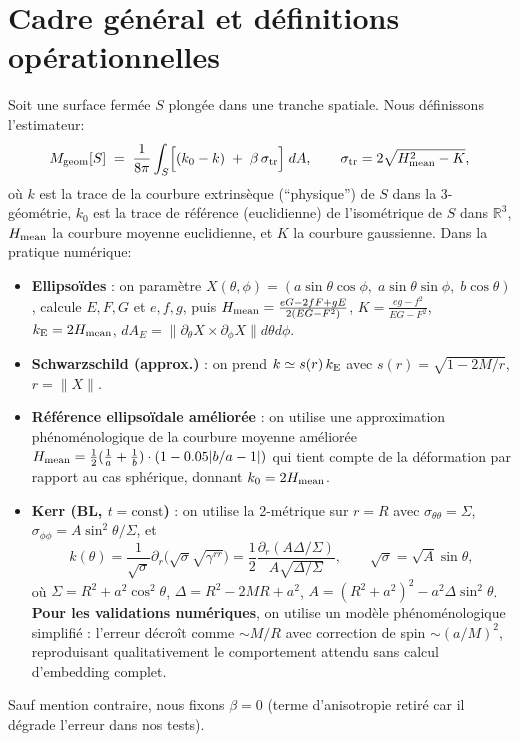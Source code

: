 \documentclass[11pt]{article}
\begin{document}
\section{Cadre g\'en\'eral et d\'efinitions op\'erationnelles}
Soit une surface ferm\'ee $S$ plong\'ee dans une tranche spatiale. Nous d\'efinissons l'estimateur:
\begin{equation}
M_{\rm geom}[S] \;=\; \frac{1}{8\pi}\int_S\!\Big[(k_0 - k)\;+\;\beta\,\sigma_{\rm tr}\Big]\; dA,
\qquad \sigma_{\rm tr}=2\sqrt{H_{\rm mean}^2-K},
\end{equation}
o\`u $k$ est la trace de la courbure extrins\`eque (``physique'') de $S$ dans la 3-g\'eom\'etrie, 
$k_0$ est la trace de r\'ef\'erence (euclidienne) de l'iso\-m\'etrique de $S$ dans $\mathbb{R}^3$, $H_{\rm mean}$ la courbure moyenne euclidienne, et $K$ la courbure gaussienne. 
Dans la pratique num\'erique:
\begin{itemize}
\item \textbf{Ellipso\"ides} : on param\`etre $X(\theta,\phi)=(a\sin\theta\cos\phi,\;a\sin\theta\sin\phi,\;b\cos\theta)$, calcule $E,F,G$ et $e,f,g$, puis 
$H_{\rm mean}=\frac{eG-2fF+gE}{2(EG-F^2)}$, $K=\frac{eg-f^2}{EG-F^2}$, $k_{\rm E}=2H_{\rm mean}$, $dA_E=\|\partial_\theta X\times\partial_\phi X\|d\theta d\phi$.
\item \textbf{Schwarzschild (approx.)} : on prend $k\simeq s(r)\,k_{\rm E}$ avec $s(r)=\sqrt{1-2M/r}$, $r=\|X\|$. 
\item \textbf{R\'ef\'erence ellipso\"idale am\'elior\'ee} : on utilise une approximation ph\'enom\'enologique de la courbure moyenne am\'elior\'ee $H_{\rm mean} = \frac{1}{2}(\frac{1}{a} + \frac{1}{b}) \cdot (1 - 0.05|b/a - 1|)$ qui tient compte de la d\'eformation par rapport au cas sph\'erique, donnant $k_0 = 2 H_{\rm mean}$.
\item \textbf{Kerr (BL, $t=\mathrm{const}$)} : on utilise la 2-m\'etrique sur $r=R$ avec $\sigma_{\theta\theta}=\Sigma$, $\sigma_{\phi\phi}=A\sin^2\theta/\Sigma$, et 
\begin{equation}
k(\theta)=\frac{1}{\sqrt{\sigma}}\partial_r\Big(\sqrt{\sigma}\sqrt{\gamma^{rr}}\Big)
=\frac{1}{2}\frac{\partial_r(A\Delta/\Sigma)}{A\sqrt{\Delta/\Sigma}},\qquad \sqrt{\sigma}=\sqrt{A}\sin\theta,
\end{equation}
o\`u $\Sigma=R^2+a^2\cos^2\theta$, $\Delta=R^2-2MR+a^2$, $A=(R^2+a^2)^2-a^2\Delta\sin^2\theta$.
\textbf{Pour les validations num\'eriques}, on utilise un mod\`ele ph\'enom\'enologique simplifi\'e : l'erreur d\'ecro\^it comme $\sim M/R$ avec correction de spin $\sim (a/M)^2$, reproduisant qualitativement le comportement attendu sans calcul d'embedding complet.
\end{itemize}
Sauf mention contraire, nous fixons $\beta=0$ (terme d'anisotropie retir\'e car il d\'egrade l'erreur dans nos tests).
\end{document}
